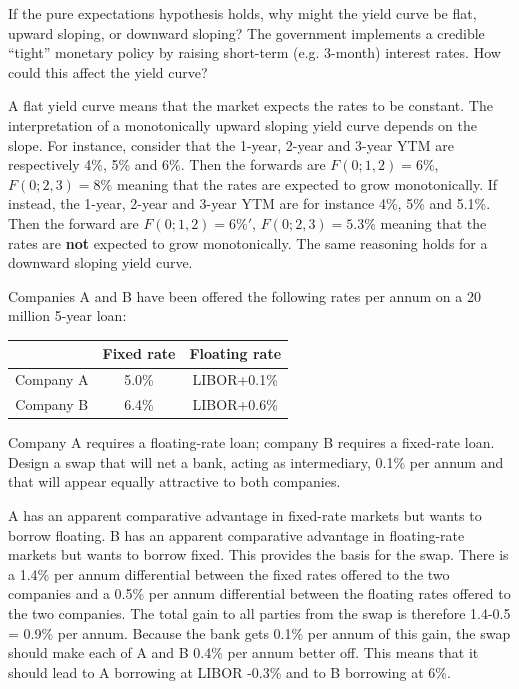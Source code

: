 \documentclass[12pt,a4paper]{exam}
\begin{document}
\begin{questions}
\question If the pure expectations hypothesis holds, why might the yield curve be flat, upward sloping, or downward sloping? The government implements a credible “tight” monetary policy by raising short-term (e.g. 3-month) interest rates. How could this affect the yield curve?
\begin{solution}
A flat yield curve means that the market expects the rates to be constant.
The interpretation of a monotonically upward sloping yield curve depends on the slope. For instance, consider that the 1-year, 2-year and 3-year YTM are respectively 4\%, 5\% and 6\%. Then the forwards are $F(0;1,2)=6\%$, $F(0;2,3)=8\%$ meaning that the rates are expected to grow monotonically. If instead, the 1-year, 2-year and 3-year YTM are for instance  4\%, 5\% and 5.1\%. Then the forward are $F(0;1,2)=6\%'$, $F(0;2,3)=5.3\%$ meaning that the rates are \textbf{not} expected to grow monotonically. 
The same reasoning holds for a downward sloping yield curve.
\end{solution}

\question Companies A and B have been offered the following rates per annum on a 20 million 5-year loan:
\begin{center}
\begin{tabular}{|c|c|c|}
\hline
& Fixed rate & Floating rate \\ \hline
Company A &  5.0\% & LIBOR+0.1\% \\ \hline
Company B & 6.4\% & LIBOR+0.6\%  \\ \hline
\end{tabular}
\end{center}

Company A requires a floating-rate loan; company B requires a fixed-rate loan. Design a swap that will net a bank, acting as intermediary, 0.1\% per annum and that will appear equally attractive to both companies.
\begin{solution}
A has an apparent comparative advantage in fixed-rate markets but wants to borrow floating. B has an apparent comparative advantage in floating-rate markets but wants to borrow fixed. This provides the basis for the swap. There is a 1.4\% per annum differential between the fixed rates offered to the two companies and a 0.5\% per annum
differential between the floating rates offered to the two companies. The total gain to all parties from the swap is therefore 1.4-0.5 = 0.9\% per annum. Because the bank gets 0.1\% per annum of this gain, the swap should make each of A and B 0.4\% per
annum better off. This means that it should lead to A borrowing at LIBOR -0.3\% and to B borrowing at 6\%. 
\end{solution}


\end{questions}
\end{document}
